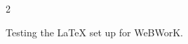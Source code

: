 \documentclass[10pt]{exam}
\begin{document}
\voffset=-0.8in
\begin{multicols}{2}


Testing the LaTeX set up for WeBWorK.


\end{multicols}
\vfill
\end{document}
